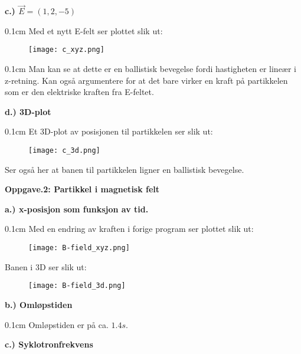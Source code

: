\documentclass[11pt, a4 paper]{article}
\newenvironment{tabbed}{\begin{addmargin}{0.1cm}}{\end{addmargin}}
\newcommand{\sectiontitle}[1]{\begin{center} \Large\textbf{{#1}} \end{center}}
\newcommand{\sectionundertitle}[1]{\hspace{-0.5cm} \textbf{{#1}}}
\newcommand{\vsp}{\vspace{0.2cm}}
\begin{document}
\newpage
\sectionundertitle{c.) $\vec{E} = (1,2,-5)$}
    \begin{tabbed}
        Med et nytt E-felt ser plottet slik ut:
    \end{tabbed}
        \begin{figure}[H]
            \centering
            \texttt{[image: c\_xyz.png]}
        \end{figure}
    \begin{tabbed}
        Man kan se at dette er en ballistisk bevegelse fordi hastigheten er lineær i z-retning. Kan også argumentere for at det bare virker en kraft på partikkelen som er den elektriske kraften fra E-feltet.
    \end{tabbed}\vsp
\newpage
\sectionundertitle{d.) 3D-plot}
        \begin{tabbed}
            Et 3D-plot av posisjonen til partikkelen ser slik ut:
            \begin{figure}[H]
                \centering
                \texttt{[image: c\_3d.png]}
            \end{figure}
            Ser også her at banen til partikkelen ligner en ballistisk bevegelse.
        \end{tabbed}
\newpage
\sectiontitle{Oppgave.2: Partikkel i magnetisk felt}
\sectionundertitle{a.) x-posisjon som funksjon av tid.}
    \begin{tabbed}
        Med en endring av kraften i forige program ser plottet slik ut:
        \begin{figure}[H]
        \centering
            \texttt{[image: B-field\_xyz.png]}
        \end{figure}
        Banen i 3D ser slik ut:
        \begin{figure}[H]
        \centering
            \texttt{[image: B-field\_3d.png]}
        \end{figure}
    \end{tabbed}\vsp
\sectionundertitle{b.) Omløpstiden}
    \begin{tabbed}
        Omløpstiden er på ca. $1.4s$.
    \end{tabbed}\vsp
\sectionundertitle{c.) Syklotronfrekvens}
\end{document}
